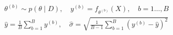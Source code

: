 ﻿\documentclass{article}
\begin{document}
\begin{preview}
\(\displaystyle
\begin{gathered}
  \theta^{(b)}\sim p(\theta\mid D), \quad
  y^{(b)}=f_{\theta^{(b)}}(X), \quad b=1\dots,B \\
  \hat{y}
  = \frac{1}{B}\sum_{b=1}^{B}y^{(b)}, \quad
  \hat{\sigma}
  = \sqrt{\frac{1}{B-1}
  \sum_{b=1}^{B}\left(y^{(b)}-\hat y\right)^2}
\end{gathered}
\)
\end{preview}
\end{document}
